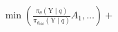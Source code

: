 \documentclass[preview]{standalone}
\begin{document}
\begin{align*}
\min \left( \frac{\pi_\theta(\text{Y} \mid q)}{\pi_{\theta_{\text{old}}}(\text{Y} \mid q)} A_1, \dots \right) +
\end{align*}
\end{document}

